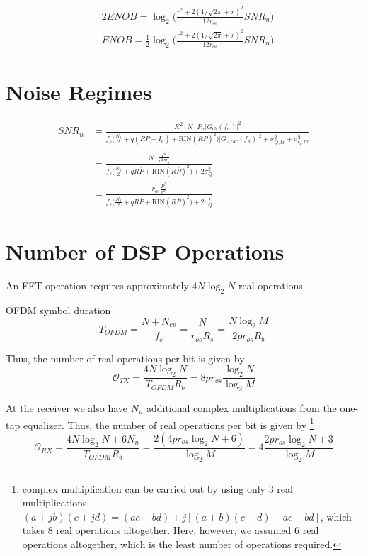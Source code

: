 \documentclass[a4paper]{article}
\begin{document}
\begin{align} \nonumber
& 2ENOB = \log_2\bigg(\frac{r^2 + 2(1/\sqrt{2\pi} + r)^2}{12r_{os}}SNR_n\bigg) \\
& ENOB = \frac{1}{2}\log_2\bigg(\frac{r^2 + 2(1/\sqrt{2\pi} +r)^2}{12r_{os}}SNR_n\bigg)
\end{align}

\section{Noise Regimes}

\begin{align} \nonumber
SNR_n &= \frac{K^2\cdot N\cdot P_n|G_{ch}(f_n)|^2}{f_s\Big(\frac{N_0}{2} + q(R\bar{P} + I_d) + \text{RIN}(R\bar{P})^2\Big)|G_{ADC}(f_n)|^2 + \sigma_{Q, tx}^2 + \sigma_{Q, rx}^2} \\
&= \frac{N\cdot \frac{\bar{P}^2}{r^2N_u}}{f_s\Big(\frac{N_0}{2} + qR\bar{P} + \text{RIN}(R\bar{P})^2\Big) + 2\sigma_{Q}^2} \\
&= \frac{r_{os}\frac{\bar{P}^2}{r^2}}{f_s\Big(\frac{N_0}{2} + qR\bar{P} + \text{RIN}(R\bar{P})^2\Big) + 2\sigma_{Q}^2}
\end{align}

\section{Number of DSP Operations}
An FFT operation requires approximately $4N\log_2 N$ real operations.

OFDM symbol duration
\begin{equation}
T_{OFDM} = \frac{N + N_{cp}}{f_s} = \frac{N}{r_{os}R_s}  = \frac{N\log_2 M}{2pr_{os}R_b}
\end{equation}

Thus, the number of real operations per bit is given by
\begin{equation}
\mathcal{O}_{TX} = \frac{4N\log_2 N}{T_{OFDM}R_b} = 8pr_{os}\frac{\log_2 N}{\log_2 M}
\end{equation}

At the receiver we also have $N_u$ additional complex multiplications from the one-tap equalizer. Thus, the number of real operations per bit is given by \footnote{complex multiplication can be carried out by using only 3 real multiplications: $(a + jb)(c + jd) = (ac-bd) + j[(a+b)(c+d)-ac-bd]$, which takes 8 real operations altogether. Here, however, we assumed 6 real operations altogether, which is the least number of operations required.}
\begin{equation}
\mathcal{O}_{RX} = \frac{4N\log_2 N + 6N_u}{T_{OFDM}R_b} = \frac{2(4pr_{os}\log_2 N + 6)}{\log_2 M} = 4\frac{2pr_{os}\log_2 N + 3}{\log_2 M}
\end{equation}
\end{document}

